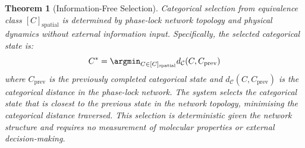 \documentclass[12pt,a4paper]{article}
\newtheorem{theorem}{Theorem}[section]
\theoremstyle{definition}
\theoremstyle{remark}
\newcommand{\catspace}{\mathcal{C}}
\begin{document}
\begin{theorem}[Information-Free Selection]
\label{thm:information_free}
Categorical selection from equivalence class $[C]_{\text{spatial}}$ is determined by phase-lock network topology and physical dynamics without external information input. Specifically, the selected categorical state is:
\begin{equation}
C^* = \argmin_{C \in [C]_{\text{spatial}}} d_{\catspace}(C, C_{\text{prev}})
\end{equation}
where $C_{\text{prev}}$ is the previously completed categorical state and $d_{\catspace}(C, C_{\text{prev}})$ is the categorical distance in the phase-lock network. The system selects the categorical state that is closest to the previous state in the network topology, minimising the categorical distance traversed. This selection is deterministic given the network structure and requires no measurement of molecular properties or external decision-making.
\end{theorem}
\end{document}
